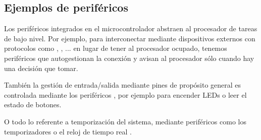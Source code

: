 \documentclass[../main.tex]{subfiles}
\begin{document}
        \subsection{Ejemplos de periféricos}
            Los periféricos integrados en el microcontrolador abstraen al procesador de tareas de bajo nivel. Por ejemplo, para interconectar mediante dispositivos externos con protocolos como  \REFMAN[32,33],  \REFMAN[27],  \REFMAN[28]... en lugar de tener al procesador ocupado, tenemos periféricos que autogestionan la conexión y avisan al procesador sólo cuando hay una decisión que tomar.

            También la gestión de entrada/salida mediante pines de propósito general es controlada mediante los periféricos  \REFMAN[6], por ejemplo para encender LEDs o leer el estado de botones.

            O todo lo referente a temporización del sistema, mediante periféricos como los temporizadores  \REFMAN[21] o el reloj de tiempo real  \REFMAN[25].

\end{document}

